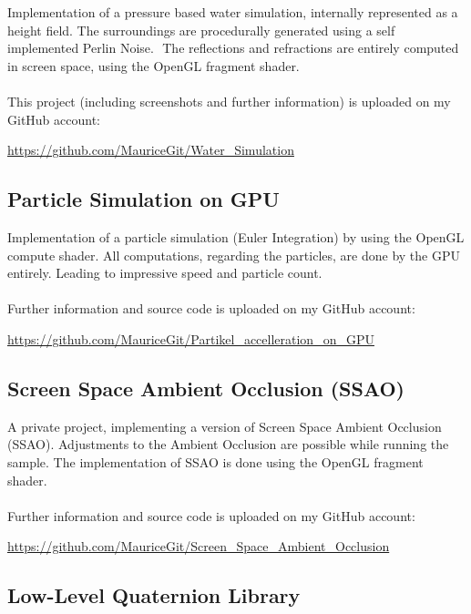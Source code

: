 \documentclass[a4paper, 12pt]{article}
\begin{document}
Implementation of a pressure based water simulation, internally represented as a height field.
The surroundings are procedurally generated using a self implemented Perlin Noise.
\newpage $ $\newline
The reflections and refractions are entirely computed in screen space, using the OpenGL fragment
shader.
\\
\\
This project (including screenshots and further information) is uploaded on my GitHub account:

\begin{center}
	\url{https://github.com/MauriceGit/Water_Simulation}
\end{center}

\subsection{Particle Simulation on GPU}

Implementation of a particle simulation (Euler Integration) by using the OpenGL compute shader.
All computations, regarding the particles, are done by the GPU entirely. Leading to impressive 
speed and particle count.
\\
\\
Further information and source code is uploaded on my GitHub account:

\begin{center}
	\url{https://github.com/MauriceGit/Partikel_accelleration_on_GPU}
\end{center}

\subsection{Screen Space Ambient Occlusion (SSAO)}

A private project, implementing a version of Screen Space Ambient Occlusion (SSAO). Adjustments to the Ambient 
Occlusion are possible while running the sample. The implementation of SSAO is done using the
OpenGL fragment shader.
\\
\\
Further information and source code is uploaded on my GitHub account:

\begin{center}
	\url{https://github.com/MauriceGit/Screen_Space_Ambient_Occlusion}
\end{center}

\subsection{Low-Level Quaternion Library}
\end{document}
